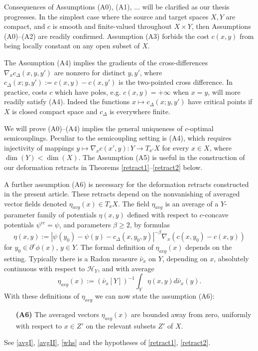 \documentclass[12pt]{amsart}
\theoremstyle{definition}
\theoremstyle{remark}
\newcommand{\del}{\partial}
\newcommand{\cd}{c_\Delta}
\begin{document}
Consequences of Assumptions (A0), (A1), $\ldots$ will be clarified as our thesis progresses. In the simplest case where the source and target spaces $X,Y$ are compact, and $c$ is smooth and finite-valued throughout $X\times Y$, then Assumptions (A0)--(A2) are readily confirmed. Assumption (A3) forbids the cost $c(x,y)$ from being locally constant on any open subset of $X$. 

The Assumption (A4) implies the gradients of the cross-differences $\nabla_x \cd(x,y,y')$ are nonzero for distinct $y,y'$, where $\cd(x;y, y'):=c(x,y)-c(x,y')$ is the two-pointed cross difference. In practice, costs $c$ which have poles, e.g. $c(x,y)=+\infty$ when $x=y$, will more readily satisfy (A4). Indeed the functions $x\mapsto \cd(x;y, y')$ have critical points if $X$ is closed compact space and $\cd$ is everywhere finite. 

We will prove (A0)--(A4) implies the general uniqueness of $c$-optimal semicouplings. Peculiar to the semicoupling setting is (A4), which requires injectivity of mappings $y\mapsto \nabla_x c(x',y):Y\to T_{x'} X$ for every $x\in X$, where $\dim(Y)< \dim(X)$. The Assumption (A5) is useful in the construction of our deformation retracts in Theorems \ref{retract1}--\ref{retract2} below. 

A further assumption (A6) is necessary for the deformation retracts constructed in the present article. These retracts depend on the nonvanishing of averaged vector fields denoted $\eta_{avg}(x) \in T_x X$. The field $\eta_{avg}$ is an average of a $Y$-parameter family of potentials $\eta(x,y)$ defined with respect to $c$-concave potentials $\psi^{cc}=\psi$, and parameters $\beta\geq 2$, by formulas\begin{equation}\label{introetaavg}
\eta(x,y):=|\psi(y_0)-\psi(y)-\cd(x,y_0,y)|^{-\beta} \nabla_x (c(x,y_0)-c(x,y)) 
\end{equation} for $y_0\in \del^c \phi(x)$, $y\in Y$. %
The formal definition of $\eta_{avg}(x)$ depends on the setting. Typically there is a Radon measure $\bar{\nu}_x$ on $Y$, depending on $x$, absolutely continuous with respect to $\mathscr{H}_Y$, and with average \begin{equation}\label{introavg}
\eta_{avg}(x):=(\bar{\nu}_x[Y])^{-1} \int_Y \eta(x,y)d\bar{\nu}_x(y).
\end{equation}
With these definitions of $\eta_{avg}$ we can now state the assumption (A6): 
\begin{itemize}
\item[\textbf{(A6)}] 
The averaged vectors $\eta_{avg}(x)$ are bounded away from zero, uniformly with respect to $x\in Z'$ on the relevant subsets $Z'$ of $X$.
\end{itemize}
See \eqref{avgI}, \eqref{avgII}, \ref{whs} and the hypotheses of \ref{retract1}, \ref{retract2}. 
\end{document}
